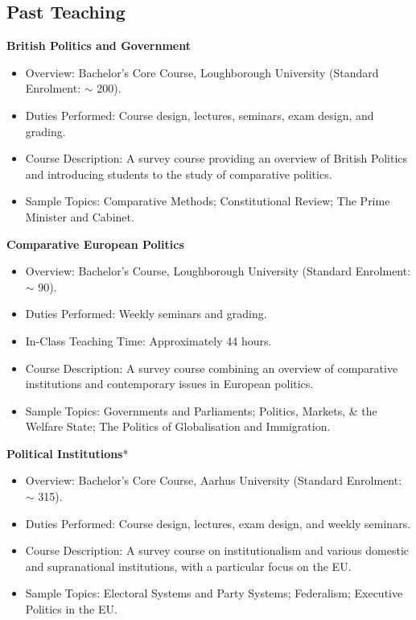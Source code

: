 \documentclass[11pt]{article}
\begin{document}
	\subsection{Past Teaching}
		  \textbf{British Politics and Government}
	      \begin{itemize}[itemsep=0em, topsep=0em, partopsep=0em]
	      	\kern-\parskip\item Overview: Bachelor’s Core Course, Loughborough University (Standard Enrolment: $\sim$ 200).
	      	\item Duties Performed: Course design, lectures, seminars, exam design, and grading.
	      	\item Course Description: A survey course providing an overview of British Politics and introducing students to the study of comparative politics. 
	      	\item Sample Topics: Comparative Methods; Constitutional Review; The Prime Minister and Cabinet.
	      \end{itemize}
	\textbf{Comparative European Politics}
	      \begin{itemize}[itemsep=0em, topsep=0em, partopsep=0em]
	      	\kern-\parskip\item Overview: Bachelor’s Course, Loughborough University (Standard Enrolment: $\sim$ 90).
	      	\item Duties Performed: Weekly seminars and grading.
	      	\item In-Class Teaching Time: Approximately 44 hours. 
	      	\item Course Description: A survey course combining an overview of comparative institutions and contemporary issues in European politics.
	      	\item Sample Topics: Governments and Parliaments; Politics, Markets, \& the Welfare State; The Politics of Globalisation and Immigration.
	      \end{itemize}
	\textbf{Political Institutions}*
	      \begin{itemize}[itemsep=0em, topsep=0em, partopsep=0em]
	      	\kern-\parskip\item Overview: Bachelor’s Core Course, Aarhus University (Standard Enrolment: $\sim$ 315).
	      	\item Duties Performed: Course design, lectures, exam design, and weekly seminars.
	      	\item Course Description: A survey course on institutionalism and various domestic and supranational institutions, with a particular focus on the EU.
	      	\item Sample Topics: Electoral Systems and Party Systems; Federalism; Executive Politics in the EU.
	      \end{itemize}
\end{document}
